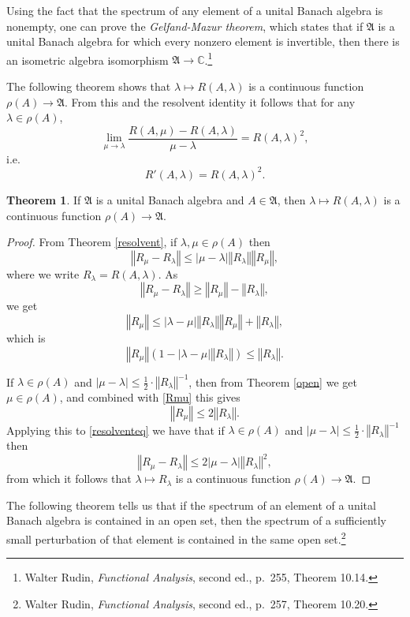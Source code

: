 \documentclass{article}
\newcommand{\norm}[1]{\left\Vert #1 \right\Vert}
\theoremstyle{definition}
\newtheorem{theorem}{Theorem}
\theoremstyle{definition}
\begin{document}
Using the fact that the spectrum of any element of a unital Banach algebra is nonempty, one can prove the
 {\em Gelfand-Mazur theorem}, which states that if $\mathfrak{A}$ is a unital Banach algebra for which every nonzero element is invertible, then there is an isometric
algebra isomorphism $\mathfrak{A} \to \mathbb{C}$.\footnote{Walter Rudin, {\em Functional Analysis}, second ed., p.~255, Theorem 10.14.}



The following theorem shows
that $\lambda \mapsto R(A,\lambda)$ is a continuous function $\rho(A) \to \mathfrak{A}$. From this and the resolvent identity it follows that
for any $\lambda \in \rho(A)$,
\[
\lim_{\mu \to \lambda} \frac{R(A,\mu)-R(A,\lambda)}{\mu-\lambda} = R(A,\lambda)^2,
\]
i.e.
\[
R'(A,\lambda)=R(A,\lambda)^2.
\]

\begin{theorem}
If $\mathfrak{A}$ is a unital Banach algebra and $A \in \mathfrak{A}$, then $\lambda \mapsto R(A,\lambda)$ is a continuous function
$\rho(A) \to \mathfrak{A}$.
\label{resolventcont}
\end{theorem}
\begin{proof}
From Theorem \ref{resolvent},
if $\lambda,\mu  \in \rho(A)$ then
\begin{equation}
\norm{R_\mu-R_\lambda} \leq |\mu-\lambda| \norm{R_\lambda} \norm{R_\mu},
\label{resolventeq}
\end{equation}
where we write $R_\lambda=R(A,\lambda)$.
As
\[
\norm{R_\mu-R_\lambda} \geq \norm{R_\mu}-\norm{R_\lambda},
\]
we get
\[
\norm{R_\mu} \leq |\lambda-\mu| \norm{R_\lambda} \norm{R_\mu} + \norm{R_\lambda},
\]
which is
\begin{equation}
\norm{R_\mu}(1-|\lambda-\mu| \norm{R_\lambda}) \leq \norm{R_\lambda}.
\label{Rmu}
\end{equation}

If $\lambda \in \rho(A)$ and 
$|\mu-\lambda| \leq \frac{1}{2}\cdot \norm{R_\lambda}^{-1}$, then
from Theorem \ref{open} we get $\mu \in \rho(A)$, and  combined with \eqref{Rmu} this gives 
\[
\norm{R_\mu} \leq 2 \norm{R_\lambda}.
\]
Applying this to \eqref{resolventeq} we have that if $\lambda \in \rho(A)$ and $|\mu-\lambda| \leq \frac{1}{2}\cdot \norm{R_\lambda}^{-1}$ then
\[
\norm{R_\mu-R_\lambda} \leq 2|\mu-\lambda| \norm{R_\lambda}^2,
\]
from which it follows that 
 $\lambda \mapsto R_\lambda$ is a continuous function $\rho(A) \to \mathfrak{A}$.
\end{proof}


The following theorem tells us that if the spectrum of an element of a unital Banach algebra is contained in an open set,
 then the spectrum of a sufficiently small perturbation of that element is contained in the same open set.\footnote{Walter Rudin, {\em Functional Analysis}, second ed., p.~257, Theorem 10.20.} 
 
\end{document}
